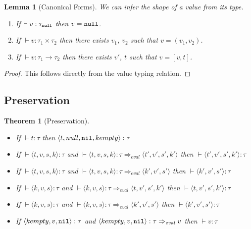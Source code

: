 \documentclass{article}
\newtheorem{theorem}{Theorem}
\newtheorem{lemma}{Lemma}
\begin{document}
\begin{lemma}[Canonical Forms]
  We can infer the shape of a value from its type.
  \begin{enumerate}
  \item If $\vdash v : \tau_{\mathtt{null}}$ then $v = \mathtt{null}$.
  \item If $\vdash v : \tau_1 \times \tau_2$ then there exists $v_1$,
    $v_2$ such that $v = (v_1, v_2)$.
  \item If $\vdash v : \tau_1 \rightarrow \tau_2$ then there exists
    $v'$, $t$ such that $v = [v, t]$.
  \end{enumerate}
\end{lemma}

\begin{proof}
  This follows directly from the value typing relation.
\end{proof}

\subsection{Preservation}

\begin{theorem}[Preservation]
  \begin{itemize} \hfill
  \item If $\vdash t : \tau$ then $\langle t, null, \mathtt{nil}, kempty \rangle : \tau$ 
  \item If $\vdash \langle t, v, s, k \rangle : \tau$ and $\vdash
    \langle t, v, s, k \rangle : \tau \Rightarrow_\mathit{eval}
    \langle t', v', s', k' \rangle$ then $\vdash \langle t', v', s',
    k' \rangle : \tau$
  \item If $\vdash \langle t, v, s, k \rangle : \tau$ and $\vdash \langle t, v,
  s, k \rangle : \tau  \Rightarrow_\mathit{eval} \langle k', v', s' \rangle$
  then $\vdash \langle k', v', s' \rangle : \tau$
  \item If $\vdash \langle k, v, s \rangle : \tau$ and $\vdash \langle k, v,
  s \rangle : \tau  \Rightarrow_\mathit{eval} \langle t, v', s', k' \rangle$
  then $\vdash \langle t, v', s', k' \rangle : \tau$
  \item If $\vdash \langle k, v, s \rangle : \tau$ and $\vdash \langle k, v,
  s \rangle : \tau  \Rightarrow_\mathit{eval} \langle k', v', s' \rangle$
  then $\vdash \langle k', v', s' \rangle : \tau$
  \item If $\langle kempty, v, \mathtt{nil} \rangle : \tau$ and $\langle kempty, v, \mathtt{nil}
  \rangle : \tau \Rightarrow_\mathit{eval} v$ then $\vdash v : \tau$ 
    
  \end{itemize}
\end{theorem}
\end{document}
